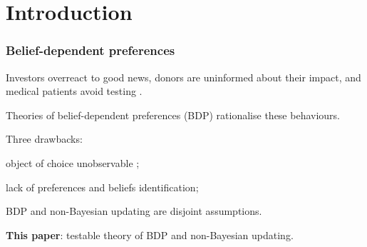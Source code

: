 \documentclass[usenames,dvipsnames,aspectratio=169,11pt, envcountsect, handout]{beamer}
\begin{document}
\section{Introduction}

\begin{frame}
	\maketitle

\end{frame}

\begin{frame}\frametitle{Belief-dependent preferences}

	Investors overreact to good news, donors are uninformed about their impact, and medical patients avoid testing \citep{danielOverconfidentInvestorsPredictable2015,golmanInformationAvoidance2017}.

	\vfill

	Theories of belief-dependent preferences (BDP) rationalise these behaviours.

	\vfill \pause

	Three drawbacks:

	\vfill

	\begin{wideitemize}
		\item object of choice unobservable \citep{benabou2016mindful,koszegiUtilityAnticipationPersonal2010};
		\item lack of preferences and beliefs identification;
		\item BDP and non-Bayesian updating are disjoint assumptions.
	\end{wideitemize}

	\vfill

	\textbf{This paper}: testable theory of BDP and non-Bayesian updating.

\end{frame}
\end{document}
